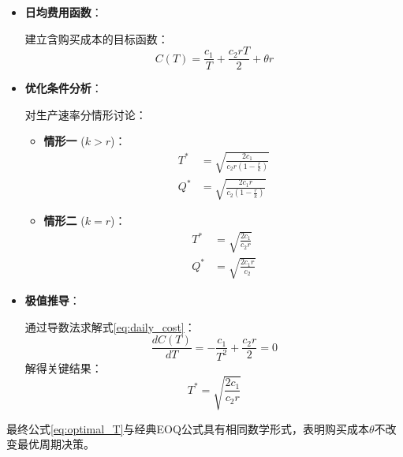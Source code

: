 \begin{itemize}
    \item \textbf{日均费用函数}：
    
    建立含购买成本的目标函数：
    \begin{equation}\label{eq:daily_cost}
        C(T) = \frac{c_1}{T} + \frac{c_2rT}{2} + \theta r
    \end{equation}

    \item \textbf{优化条件分析}：
    
    对生产速率分情形讨论：
    \begin{itemize}
        \item \textbf{情形一} ($k > r$)：
        \begin{align}
            T^* &= \sqrt{\frac{2c_1}{c_2r\left(1-\frac{r}{k}\right)}} \label{eq:case1_T} \\
            Q^* &= \sqrt{\frac{2c_1r}{c_2\left(1-\frac{r}{k}\right)}} \label{eq:case1_Q}
        \end{align}
        
        \item \textbf{情形二} ($k = r$)：
        \begin{align}
            T^* &= \sqrt{\frac{2c_1}{c_2r}} \label{eq:case2_T} \\
            Q^* &= \sqrt{\frac{2c_1r}{c_2}} \label{eq:case2_Q}
        \end{align}
    \end{itemize}

    \item \textbf{极值推导}：
    
    通过导数法求解式\eqref{eq:daily_cost}：
    \begin{equation}\label{eq:derivative}
        \frac{dC(T)}{dT} = -\frac{c_1}{T^2} + \frac{c_2r}{2} = 0
    \end{equation}
    解得关键结果：
    \begin{equation}\label{eq:optimal_T}
        T^* = \sqrt{\frac{2c_1}{c_2r}}
    \end{equation}
\end{itemize}


最终公式\eqref{eq:optimal_T}与经典EOQ公式具有相同数学形式，表明购买成本$\theta$不改变最优周期决策。
